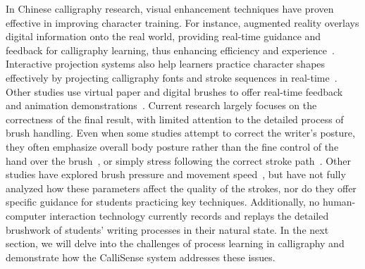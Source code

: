 In Chinese calligraphy research, visual enhancement techniques have proven effective in improving character training. For instance, augmented reality overlays digital information onto the real world, providing real-time guidance and feedback for calligraphy learning, thus enhancing efficiency and experience~\cite{10.1145/1935701.1935769}. Interactive projection systems also help learners practice character shapes effectively by projecting calligraphy fonts and stroke sequences in real-time~\cite{9122337}. Other studies use virtual paper and digital brushes to offer real-time feedback and animation demonstrations~\cite{sym11091071}.
Current research largely focuses on the correctness of the final result, with limited attention to the detailed process of brush handling. Even when some studies attempt to correct the writer's posture, they often emphasize overall body posture rather than the fine control of the hand over the brush~\cite{10.1145/1935701.1935769}, or simply stress following the correct stroke path~\cite{10.1145/3029798.3038422}. Other studies have explored brush pressure and movement speed~\cite{10.1145/3377325.3377534}, but have not fully analyzed how these parameters affect the quality of the strokes, nor do they offer specific guidance for students practicing key techniques. Additionally, no human-computer interaction technology currently records and replays the detailed brushwork of students' writing processes in their natural state. In the next section, we will delve into the challenges of process learning in calligraphy and demonstrate how the CalliSense system addresses these issues.

